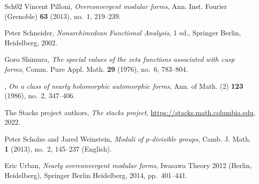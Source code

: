 \documentclass[10pt, oneside]{amsart}
\numberwithin{equation}{subsection}
\theoremstyle{definition}
\theoremstyle{remark}
\begin{document}
\begin{thebibliography}{{Sch}02}
Vincent Pilloni, \emph{Overconvergent modular forms}, Ann. Inst. Fourier
  (Grenoble) \textbf{63} (2013), no.~1, 219--239.

Peter {Schneider}, \emph{{N}onarchimedean {F}unctional {A}nalysis}, 1 ed.,
  Springer Berlin, Heidelberg, 2002.

Goro Shimura, \emph{The special values of the zeta functions associated with
  cusp forms}, Comm. Pure Appl. Math. \textbf{29} (1976), no.~6, 783--804.

\bysame, \emph{On a class of nearly holomorphic automorphic forms}, Ann. of
  Math. (2) \textbf{123} (1986), no.~2, 347--406.

The {Stacks project authors}, \emph{The stacks project},
  \url{https://stacks.math.columbia.edu}, 2022.

Peter Scholze and Jared Weinstein, \emph{Moduli of {{\(p\)}}-divisible groups},
  Camb. J. Math. \textbf{1} (2013), no.~2, 145--237 (English).

Eric Urban, \emph{Nearly overconvergent modular forms}, Iwasawa Theory 2012
  (Berlin, Heidelberg), Springer Berlin Heidelberg, 2014, pp.~401--441.

\end{thebibliography}
\end{document}
